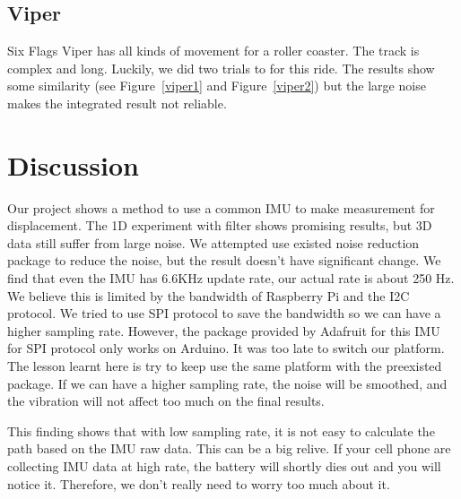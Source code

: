 \documentclass[%
 reprint,
 amsmath,amssymb,
 aps,
]{revtex4-2}
\begin{document}
\subsection{Viper}
Six Flags Viper has all kinds of movement for a roller coaster. The track is complex and long. Luckily, we did two trials to for this ride. The results show some similarity (see Figure~\ref{viper1} and Figure~\ref{viper2}) but the large noise makes the integrated result not reliable.

\section{\label{Discussion}Discussion}
Our project shows a method to use a common IMU to make measurement for displacement. The 1D experiment with filter shows promising results, but 3D data still suffer from large noise. We attempted use existed noise reduction package to reduce the noise, but the result doesn't have significant change. We find that even the IMU has 6.6KHz update rate, our actual rate is about 250 Hz. We believe this is limited by the bandwidth of Raspberry Pi and the I2C protocol. We tried to use SPI protocol\cite{spi} to save the bandwidth so we can have a higher sampling rate. However, the package provided by Adafruit for this IMU for SPI protocol only works on Arduino. It was too late to switch our platform. The lesson learnt here is try to keep use the same platform with the preexisted package. If we can have a higher sampling rate, the noise will be smoothed, and the vibration will not affect too much on the final results. 

This finding shows that with low sampling rate, it is not easy to calculate the path based on the IMU raw data. This can be a big relive. If your cell phone are collecting IMU data at high rate, the battery will shortly dies out and you will notice it. Therefore, we don’t really need to worry too much about it.
\end{document}
